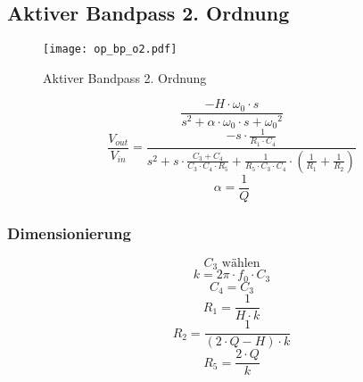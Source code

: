 



\subsection{Aktiver Bandpass 2. Ordnung}
\begin{figure}[h!]
	\centering
	\texttt{[image: op\_bp\_o2.pdf]}
	\caption{Aktiver Bandpass 2. Ordnung}
	\label{sch:op-bp-o2}
\end{figure}
\[ \frac{- H \cdot \omega_0 \cdot s}
{s^2 + \alpha \cdot \omega_0 \cdot s  + {\omega_0}^2} \]
\[ \frac{V_{out}}{V_{in}} = \frac{- s \cdot \frac{1}{R_1 \cdot C_4}}
{s^2 + s \cdot \frac{C_3 + C_4}{C_3 \cdot C_4 \cdot R_5} + 
\frac{1}{R_5 \cdot C_3 \cdot C_4} \cdot 
\left(\frac{1}{R_1} + \frac{1}{R_2}\right)} \]
\[  \alpha = \frac{1}{Q}\]
\subsubsection{Dimensionierung}
\[ C_3 \text{ wählen} \]
\[ k = 2 \pi \cdot f_0 \cdot C_3 \]
\[ C_4 = C_3 \]
\[ R_1 = \frac{1}{H \cdot k} \]
\[ R_2 = \frac{1}{(2 \cdot Q - H) \cdot k} \]
\[ R_5 = \frac{2 \cdot Q}{k} \]
